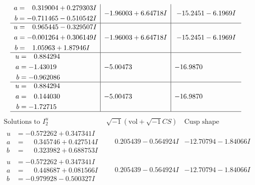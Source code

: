 \documentclass[1p]{elsarticle_modified}
\theoremstyle{definition}
\newcommand{\I}{\sqrt{-1}}
\begin{document}
$$\begin{array}{c|c|c}
\begin{aligned}
a &= \phantom{-}0.319004 + 0.279303 I \\
b &= -0.711465 - 0.510542 I\end{aligned}
 & -1.96003 + 6.64718 I & -15.2451 - 6.1969 I \\ \hline\begin{aligned}
u &= \phantom{-}0.965445 - 0.329507 I \\
a &= -0.001264 + 0.306149 I \\
b &= \phantom{-}1.05963 + 1.87946 I\end{aligned}
 & -1.96003 + 6.64718 I & -15.2451 - 6.1969 I \\ \hline\begin{aligned}
u &= \phantom{-}0.884294\phantom{ +0.000000I} \\
a &= -1.43019\phantom{ +0.000000I} \\
b &= -0.962086\phantom{ +0.000000I}\end{aligned}
 & -5.00473\phantom{ +0.000000I} & -16.9870\phantom{ +0.000000I} \\ \hline\begin{aligned}
u &= \phantom{-}0.884294\phantom{ +0.000000I} \\
a &= \phantom{-}0.144030\phantom{ +0.000000I} \\
b &= -1.72715\phantom{ +0.000000I}\end{aligned}
 & -5.00473\phantom{ +0.000000I} & -16.9870\phantom{ +0.000000I}\\
 \hline 
 \end{array}$$\newpage$$\begin{array}{c|c|c}  
\text{Solutions to }I^u_{2}& \I (\text{vol} + \sqrt{-1}CS) & \text{Cusp shape}\\
 \hline 
\begin{aligned}
u &= -0.572262 + 0.347341 I \\
a &= \phantom{-}0.345746 + 0.427514 I \\
b &= \phantom{-}0.323982 + 0.688753 I\end{aligned}
 & \phantom{-}0.205439 - 0.564924 I & -12.70794 - 1.84066 I \\ \hline\begin{aligned}
u &= -0.572262 + 0.347341 I \\
a &= \phantom{-}0.448687 + 0.081566 I \\
b &= -0.979928 - 0.500327 I\end{aligned}
 & \phantom{-}0.205439 - 0.564924 I & -12.70794 - 1.84066 I \\ \hline\begin{aligned}

\end{aligned}
\end{array}$$
\end{document}

